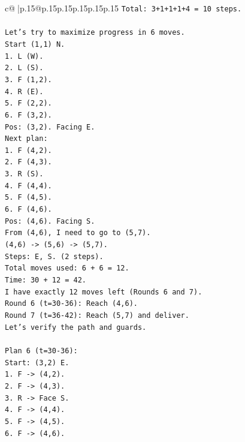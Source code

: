 \documentclass{article}
\begin{document}
{\begin{supertabular}{c@{$\;$}|p{.15\linewidth}@{}p{.15\linewidth}p{.15\linewidth}p{.15\linewidth}p{.15\linewidth}p{.15\linewidth}}
{{{\texttt{Total: 3+1+1+1+4 = 10 steps.} \\
\\ 
\texttt{Let's try to maximize progress in 6 moves.} \\
\texttt{Start (1,1) N.} \\
\texttt{1. L (W).} \\
\texttt{2. L (S).} \\
\texttt{3. F (1,2).} \\
\texttt{4. R (E).} \\
\texttt{5. F (2,2).} \\
\texttt{6. F (3,2).} \\
\texttt{Pos: (3,2). Facing E.} \\
\texttt{Next plan:} \\
\texttt{1. F (4,2).} \\
\texttt{2. F (4,3).} \\
\texttt{3. R (S).} \\
\texttt{4. F (4,4).} \\
\texttt{5. F (4,5).} \\
\texttt{6. F (4,6).} \\
\texttt{Pos: (4,6). Facing S.} \\
\texttt{From (4,6), I need to go to (5,7).} \\
\texttt{(4,6) {-}> (5,6) {-}> (5,7).} \\
\texttt{Steps: E, S. (2 steps).} \\
\texttt{Total moves used: 6 + 6 = 12.} \\
\texttt{Time: 30 + 12 = 42.} \\
\texttt{I have exactly 12 moves left (Rounds 6 and 7).} \\
\texttt{Round 6 (t=30{-}36): Reach (4,6).} \\
\texttt{Round 7 (t=36{-}42): Reach (5,7) and deliver.} \\
\texttt{Let's verify the path and guards.} \\
\\ 
\texttt{Plan 6 (t=30{-}36):} \\
\texttt{Start: (3,2) E.} \\
\texttt{1. F {-}> (4,2).} \\
\texttt{2. F {-}> (4,3).} \\
\texttt{3. R {-}> Face S.} \\
\texttt{4. F {-}> (4,4).} \\
\texttt{5. F {-}> (4,5).} \\
\texttt{6. F {-}> (4,6).} \\
}}}
\end{supertabular}}
\end{document}
